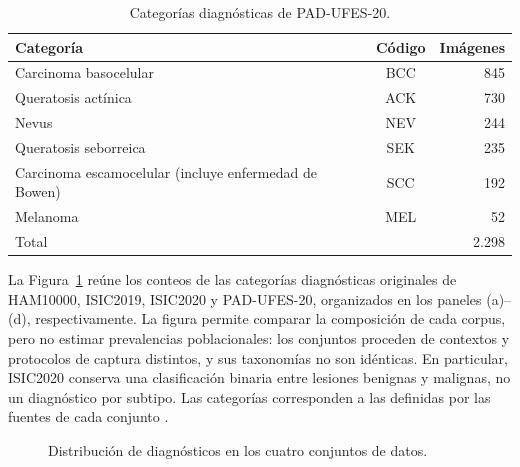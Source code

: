 \begin{table}[!htbp]
\begingroup
\fontsize{11}{13}\selectfont
\singlespacing

\centering
\caption{Categorías diagnósticas de PAD-UFES-20.}
\label{tab:pad-categorias}
\begin{tabularx}{\textwidth}{@{}Lcr@{}}
\toprule
Categoría & Código & Imágenes \\
\midrule
Carcinoma basocelular & BCC & 845 \\
Queratosis actínica & ACK & 730 \\
Nevus & NEV & 244 \\
Queratosis seborreica & SEK & 235 \\
Carcinoma escamocelular (incluye enfermedad de Bowen) & SCC & 192 \\
Melanoma & MEL & 52 \\
\midrule
Total & & 2.298 \\
\bottomrule
\end{tabularx}\par
\par\endgroup
\end{table}

\begin{sloppypar}
La Figura~\ref{fig:distribuciones-clase-combinadas} reúne los conteos de las categorías diagnósticas originales de HAM10000, ISIC2019, ISIC2020 y PAD-UFES-20, organizados en los paneles (a)--(d), respectivamente. La figura permite comparar la composición de cada corpus, pero no estimar prevalencias poblacionales: los conjuntos proceden de contextos y protocolos de captura distintos, y sus taxonomías no son idénticas. En particular, ISIC2020 conserva una clasificación binaria entre lesiones benignas y malignas, no un diagnóstico por subtipo. Las categorías corresponden a las definidas por las fuentes de cada conjunto \parencite{tschandl2018ham10000,combalia2024bcn20000,rotemberg2021isic2020,pacheco2020padufes}.
\end{sloppypar}

\begin{figure}[!htbp]
\caption{Distribución de diagnósticos en los cuatro conjuntos de datos.}
\label{fig:distribuciones-clase-combinadas}
\centering
\noindent\makebox[\linewidth][c]{}
\par\smallskip
\raggedright\fontsize{11}{13}\selectfont\singlespacing
\par{}
\end{figure}



